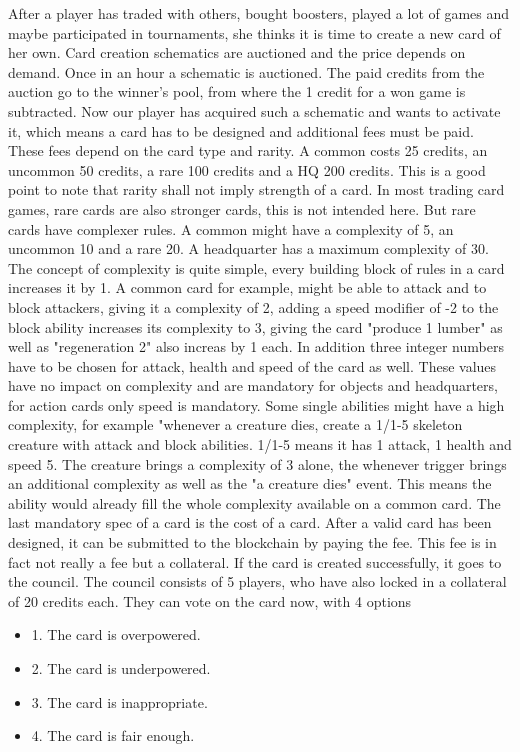 \documentclass{article}
\begin{document}
After a player has traded with others, bought boosters, played a lot of games and maybe participated in tournaments, she thinks it is time to create a new card of her own. Card creation schematics are auctioned and the price depends on demand. Once in an hour a schematic is auctioned. The paid credits from the auction go to the winner's pool, from where the 1 credit for a won game is subtracted. Now our player has acquired such a schematic and wants to activate it, which means a card has to be designed and additional fees must be paid. These fees depend on the card type and rarity. A common costs 25 credits, an uncommon 50 credits, a rare 100 credits and a HQ 200 credits. This is a good point to note that rarity shall not imply strength of a card. In most trading card games, rare cards are also stronger cards, this is not intended here. But rare cards have complexer rules. A common might have a complexity of 5, an uncommon 10 and a rare 20. A headquarter has a maximum complexity of 30. The concept of complexity is quite simple, every building block of rules in a card increases it by 1. A common card for example, might be able to attack and to block attackers, giving it a complexity of 2, adding a speed modifier of -2 to the block ability increases its complexity to 3, giving the card "produce 1 lumber" as well as "regeneration 2" also increas by 1 each. In addition three integer numbers have to be chosen for attack, health and speed of the card as well. These values have no impact on complexity and are mandatory for objects and headquarters, for action cards only speed is mandatory. Some single abilities might have a high complexity, for example "whenever a creature dies, create a 1/1-5 skeleton creature with attack and block abilities. 1/1-5 means it has 1 attack, 1 health and speed 5. The creature brings a complexity of 3 alone, the whenever trigger brings an additional complexity as well as the "a creature dies" event. This means the ability would already fill the whole complexity available on a common card. The last mandatory spec of a card is the cost of a card. After a valid card has been designed, it can be submitted to the blockchain by paying the fee. This fee is in fact not really a fee but a collateral. If the card is created successfully, it goes to the council. The council consists of 5 players, who have also locked in a collateral of 20 credits each. They can vote on the card now, with 4 options
%
\begin{itemize}
	\item 1. The card is overpowered.
	\item 2. The card is underpowered.
	\item 3. The card is inappropriate. 
	\item 4. The card is fair enough.
\end{itemize}
\end{document}
